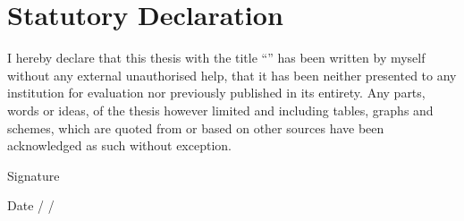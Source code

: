 \cleardoublepage

\chapter*{Statutory Declaration}

I hereby declare that this thesis with the title ``\textbf{\textit{\inserttitle}}'' has been written by myself without any external unauthorised help, that it has been neither presented to any institution for evaluation nor previously published in its entirety. Any parts, words or ideas, of the thesis however limited and including tables, graphs and schemes, which are quoted from or based on other sources have been acknowledged as such without exception.

\vskip 0.5in 
  \normalsize {Signature \underline{\hspace{1.5in}}}
  
  \vskip 0.1in
  \normalsize {Date \underline{\hspace{0.5in}} / \underline{\hspace{0.5in}} / \underline{\hspace{0.5in}}}